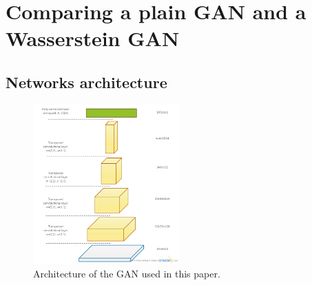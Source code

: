\section{Comparing a plain GAN and a Wasserstein GAN}

\subsection{Networks architecture}

\begin{figure}[h]
	\includegraphics[width=0.5\textwidth]{figures/arc_gen}
	\caption{Architecture of the GAN used in this paper.}
	\label{fig:gan_arc}
\end{figure}
